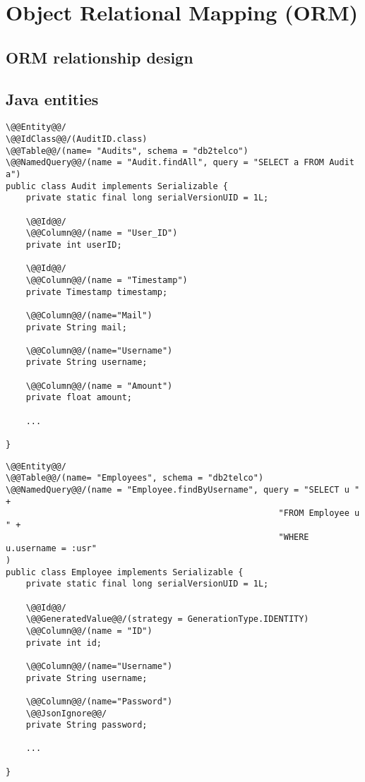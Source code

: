 
\chapter{Object Relational Mapping (ORM)}
\label{chap:orm}

\section{ORM relationship design}
\blindtext

\section{Java entities}

\begin{lstlisting}[style = JPA]
\@@Entity@@/
\@@IdClass@@/(AuditID.class)
\@@Table@@/(name= "Audits", schema = "db2telco")
\@@NamedQuery@@/(name = "Audit.findAll", query = "SELECT a FROM Audit a")
public class Audit implements Serializable {
    private static final long serialVersionUID = 1L;

    \@@Id@@/
    \@@Column@@/(name = "User_ID")
    private int userID;

    \@@Id@@/
    \@@Column@@/(name = "Timestamp")
    private Timestamp timestamp;

    \@@Column@@/(name="Mail")
    private String mail;

    \@@Column@@/(name="Username")
    private String username;

    \@@Column@@/(name = "Amount")
    private float amount;

    ...

}
\end{lstlisting}

\begin{lstlisting}[style = JPA]
\@@Entity@@/
\@@Table@@/(name= "Employees", schema = "db2telco")
\@@NamedQuery@@/(name = "Employee.findByUsername", query = "SELECT u " + 
                                                      "FROM Employee u " + 
                                                      "WHERE u.username = :usr"
)
public class Employee implements Serializable {
    private static final long serialVersionUID = 1L;

    \@@Id@@/
    \@@GeneratedValue@@/(strategy = GenerationType.IDENTITY)
    \@@Column@@/(name = "ID")
    private int id;

    \@@Column@@/(name="Username")
    private String username;

    \@@Column@@/(name="Password")
    \@@JsonIgnore@@/
    private String password;

    ...

}
\end{lstlisting}

